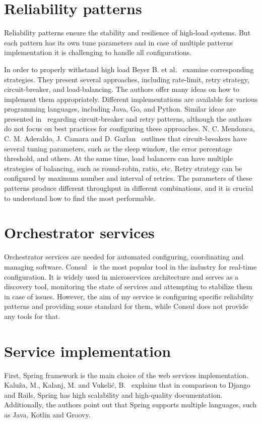 \section{Reliability patterns}\label{sec:reliability}
Reliability patterns ensure the stability and resilience of high-load systems.
But each pattern has its own tune parameters and in case of multiple patterns implementation it is challenging to handle all configurations.

In order to properly withstand high load Beyer B. et al.~\cite{google_sre} examine corresponding strategies.
They present several approaches, including rate-limit, retry strategy, circuit-breaker, and load-balancing.
The authors offer many ideas on how to implement them appropriately. Different implementations are available for various programming languages, including Java, Go, and Python.
Similar ideas are presented in~\cite{reliability_patterns} regarding circuit-breaker and retry patterns, although the authors do not focus on best practices for configuring these approaches.
N. C. Mendonca, C. M. Aderaldo, J. Camara and D. Garlan~\cite{circuit_breaker} outlines that circuit-breakers have several tuning parameters, such as the sleep window, the error percentage threshold, and others.
At the same time, load balancers can have multiple strategies of balancing, such as round-robin, ratio, etc.
Retry strategy can be configured by maximum number and interval of retries.
The parameters of these patterns produce different throughput in different combinations, and it is crucial to understand how to find the most performable.

\section{Orchestrator services}\label{sec:service-orchestrator}
Orchestrator services are needed for automated configuring, coordinating and managing software.
Consul~\cite{consul} is the most popular tool in the industry for real-time configuration.
It is widely used in microservices architecture and serves as a discovery tool, monitoring the state of services and attempting to stabilize them in case of issues.
However, the aim of my service is configuring specific reliability patterns and providing some standard for them, while Consul does not provide any tools for that.

\section{Service implementation}\label{sec:implementation}
First, Spring framework is the main choice of the web services implementation.
Kaluža, M., Kalanj, M. and Vukelić, B.~\cite{frameworks} explains that in comparison to Django and Rails, Spring has high scalability and high-quality documentation.
Additionally, the authors point out that Spring supports multiple languages, such as Java, Kotlin and Groovy.

